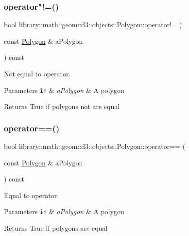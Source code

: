 \subsubsection{\texorpdfstring{operator"!=()}{operator!=()}}
{\footnotesize\ttfamily bool library\+::math\+::geom\+::d3\+::objects\+::\+Polygon\+::operator!= (\begin{DoxyParamCaption}\item[{const \hyperlink{classlibrary_1_1math_1_1geom_1_1d3_1_1objects_1_1_polygon}{Polygon} \&}]{a\+Polygon }\end{DoxyParamCaption}) const}



Not equal to operator. 


\begin{DoxyParams}[1]{Parameters}
\mbox{\tt in}  & {\em a\+Polygon} & A polygon \\
\hline
\end{DoxyParams}
\begin{DoxyReturn}{Returns}
True if polygons not are equal 
\end{DoxyReturn}
\mbox{\label{classlibrary_1_1math_1_1geom_1_1d3_1_1objects_1_1_polygon_ac8aa92cf9ed3cbcd063df07ce3a89f60}} 
\subsubsection{\texorpdfstring{operator==()}{operator==()}}
{\footnotesize\ttfamily bool library\+::math\+::geom\+::d3\+::objects\+::\+Polygon\+::operator== (\begin{DoxyParamCaption}\item[{const \hyperlink{classlibrary_1_1math_1_1geom_1_1d3_1_1objects_1_1_polygon}{Polygon} \&}]{a\+Polygon }\end{DoxyParamCaption}) const}



Equal to operator. 


\begin{DoxyParams}[1]{Parameters}
\mbox{\tt in}  & {\em a\+Polygon} & A polygon \\
\hline
\end{DoxyParams}
\begin{DoxyReturn}{Returns}
True if polygons are equal 
\end{DoxyReturn}
\mbox{\label{classlibrary_1_1math_1_1geom_1_1d3_1_1objects_1_1_polygon_a6d30846a912386e5e814e0bffa0a4042}} 
